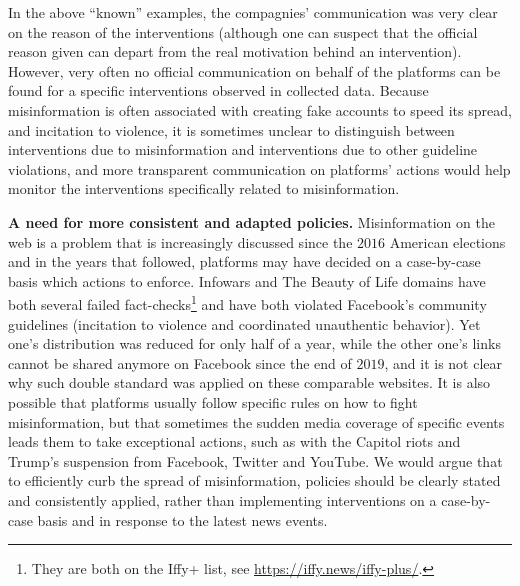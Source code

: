 \documentclass{article}
\begin{document}
In the above ``known'' examples, the compagnies' communication was very clear on the reason of the interventions (although one can suspect that the official reason given can depart from the real motivation behind an intervention). 
However, very often no official communication on behalf of the platforms can be found for a specific interventions observed in collected data. 
Because misinformation is often associated with creating fake accounts to speed its spread, and incitation to violence, it is sometimes unclear to distinguish between interventions due to misinformation and interventions due to other guideline violations, and more transparent communication on platforms' actions would help monitor the interventions specifically related to misinformation.

\smallskip

{\bf A need for more consistent and adapted policies.} Misinformation on the web is a problem that is increasingly discussed since the $2016$ American elections and in the years that followed, platforms may have decided on a case-by-case basis which actions to enforce.
Infowars and The Beauty of Life domains have both several failed fact-checks\footnote{They are both on the Iffy+ list, see \href{https://iffy.news/iffy-plus/}{https://iffy.news/iffy-plus/}.} and have both violated Facebook's community guidelines (incitation to violence and coordinated unauthentic behavior). 
Yet one's distribution was reduced for only half of a year, while the other one's links cannot be shared anymore on Facebook since the end of $2019$, and it is not clear why such double standard was applied on these comparable websites.
It is also possible that platforms usually follow specific rules on how to fight misinformation, but that sometimes the sudden media coverage of specific events leads them to take exceptional actions, such as with the Capitol riots and Trump's suspension from Facebook, Twitter and YouTube.
We would argue that to efficiently curb the spread of misinformation, policies should be clearly stated and consistently applied, rather than implementing interventions on a case-by-case basis and in response to the latest news events.

\smallskip
\end{document}
